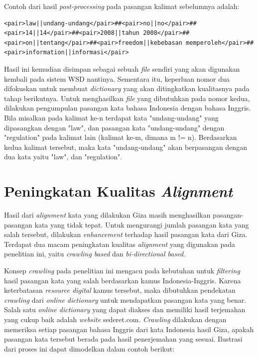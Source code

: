 Contoh dari hasil \textit{post-processing} pada pasangan kalimat sebelumnya adalah:

\begin{lstlisting}
<pair>law||undang-undang</pair>##<pair>no||no</pair>##<pair>14||14</pair>##<pair>2008||tahun 2008</pair>##<pair>on||tentang</pair>##<pair>freedom||kebebasan memperoleh</pair>##<pair>information||informasi</pair>
\end{lstlisting}

Hasil ini kemudian disimpan sebagai sebuah \textit{file} sendiri yang akan digunakan kembali pada sistem WSD nantinya. Sementara itu, keperluan nomor dua difokuskan untuk membuat \textit{dictionary} yang akan ditingkatkan kualitasnya pada tahap berikutnya. Untuk menghasilkan \textit{file} yang dibutuhkan pada nomor kedua, dilakukan pengumpulan pasangan kata bahasa Indonesia dengan bahasa Inggris. Bila misalkan pada kalimat ke-n terdapat kata "undang-undang" yang dipasangkan dengan "law", dan pasangan kata "undang-undang" dengan "regulation" pada kalimat lain (kalimat ke-m, dimana m != n). Berdasarkan kedua kalimat tersebut, maka kata "undang-undang" akan berpasangan dengan dua kata yaitu "law", dan "regulation".

\section{Peningkatan Kualitas \textit{Alignment}}

Hasil dari \textit{alignment} kata yang dilakukan Giza masih menghasilkan pasangan-pasangan kata yang tidak tepat. Untuk mengurangi jumlah pasangan kata yang salah tersebut, dilakukan \textit{enhancement} terhadap hasil pasangan kata dari Giza. Terdapat dua macam peningkatan kualitas \textit{alignment} yang digunakan pada penelitian ini, yaitu \textit{crawling based} dan \textit{bi-directional based}.

Konsep \textit{crawling} pada penelitian ini mengacu pada kebutuhan untuk \textit{filtering} hasil pasangan kata yang salah berdasarkan kamus Indonesia-Inggris. Karena keterbatasan \textit{resource digital} kamus tersebut, maka dibutuhkan pendekatan \textit{crawling} dari \textit{online dictionary} untuk mendapatkan pasangan kata yang benar. Salah satu \textit{online dictionary} yang dapat diakses dan memiliki hasil terjemahan yang cukup baik adalah \textit{website} sederet.com. \textit{Crawling} dilakukan dengan memeriksa setiap pasangan bahasa Inggris dari kata Indonesia hasil Giza, apakah pasangan kata tersebut berada pada hasil penerjemahan yang sesuai. Ilustrasi dari proses ini dapat dimodelkan dalam contoh berikut:

